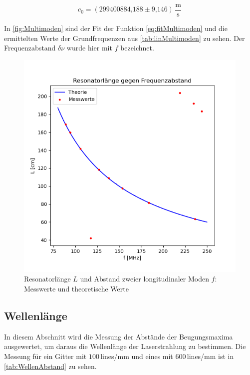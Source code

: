 \begin{equation}
c_0 = (\text{299400884,188} \pm \text{9,146})\, \frac{\text{m}}{\text{s}}
\end{equation}

In \autoref{fig:Multimoden} sind der Fit der Funktion \autoref{eq:fitMultimoden} und die ermittelten Werte der Grundfrequenzen aus \autoref{tab:linMultimoden} zu sehen. Der Frequenzabstand $\delta \nu$ wurde hier mit $f$ bezeichnet.


\begin{figure}
\includegraphics{figures/Multimoden.png}
\caption{Resonatorlänge $L$ und Abstand zweier longitudinaler Moden $f$: Messwerte und theoretische Werte}
\label{fig:Multimoden}
\end{figure}







\clearpage

\subsection{Wellenlänge}
\label{sec:Wellenlänge}

In diesem Abschnitt wird die Messung der Abstände der Beugungsmaxima ausgewertet, um daraus die Wellenlänge der Laserstrahlung zu bestimmen.
Die Messung für ein Gitter mit $100$\,lines/mm und eines mit $600$\,lines/mm ist in \autoref{tab:WellenAbstand} zu sehen.

